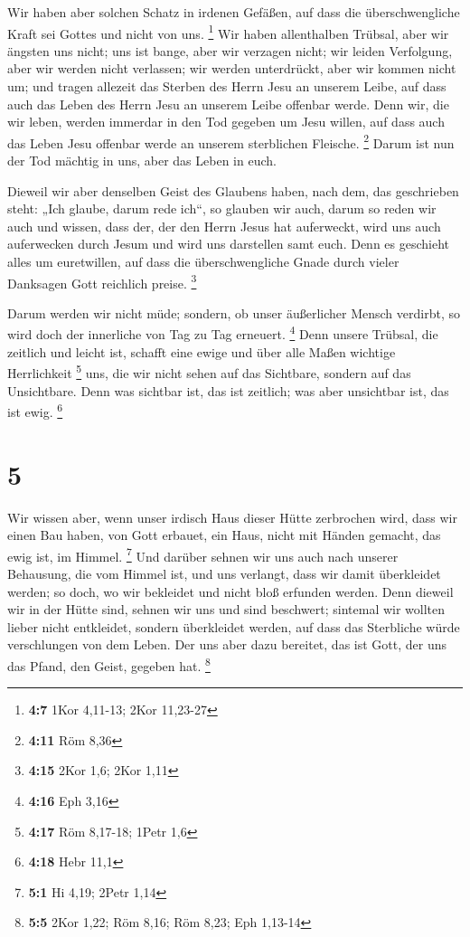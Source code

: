  Wir haben aber solchen Schatz in irdenen Gefäßen, auf
dass die überschwengliche Kraft sei Gottes und nicht von uns.
\footnote{\textbf{4:7} 1Kor 4,11-13; 2Kor 11,23-27}  Wir
haben allenthalben Trübsal, aber wir ängsten uns nicht; uns ist bange,
aber wir verzagen nicht;  wir leiden Verfolgung, aber wir
werden nicht verlassen; wir werden unterdrückt, aber wir kommen nicht
um;  und tragen allezeit das Sterben des Herrn Jesu an
unserem Leibe, auf dass auch das Leben des Herrn Jesu an unserem Leibe
offenbar werde.  Denn wir, die wir leben, werden immerdar
in den Tod gegeben um Jesu willen, auf dass auch das Leben Jesu offenbar
werde an unserem sterblichen Fleische. \footnote{\textbf{4:11} Röm 8,36}
 Darum ist nun der Tod mächtig in uns, aber das Leben in
euch.

 Dieweil wir aber denselben Geist des Glaubens haben,
nach dem, das geschrieben steht: „Ich glaube, darum rede ich``, so
glauben wir auch, darum so reden wir auch  und wissen,
dass der, der den Herrn Jesus hat auferweckt, wird uns auch auferwecken
durch Jesum und wird uns darstellen samt euch.  Denn es
geschieht alles um euretwillen, auf dass die überschwengliche Gnade
durch vieler Danksagen Gott reichlich preise. \footnote{\textbf{4:15}
  2Kor 1,6; 2Kor 1,11}

 Darum werden wir nicht müde; sondern, ob unser
äußerlicher Mensch verdirbt, so wird doch der innerliche von Tag zu Tag
erneuert. \footnote{\textbf{4:16} Eph 3,16}  Denn unsere
Trübsal, die zeitlich und leicht ist, schafft eine ewige und über alle
Maßen wichtige Herrlichkeit \footnote{\textbf{4:17} Röm 8,17-18; 1Petr
  1,6}  uns, die wir nicht sehen auf das Sichtbare,
sondern auf das Unsichtbare. Denn was sichtbar ist, das ist zeitlich;
was aber unsichtbar ist, das ist ewig. \footnote{\textbf{4:18} Hebr 11,1}

\hypertarget{section-2}{%
\section{5}\label{section-2}}

 Wir wissen aber, wenn unser irdisch Haus dieser Hütte
zerbrochen wird, dass wir einen Bau haben, von Gott erbauet, ein Haus,
nicht mit Händen gemacht, das ewig ist, im Himmel. \footnote{\textbf{5:1}
  Hi 4,19; 2Petr 1,14}  Und darüber sehnen wir uns auch
nach unserer Behausung, die vom Himmel ist, und uns verlangt, dass wir
damit überkleidet werden;  so doch, wo wir bekleidet und
nicht bloß erfunden werden.  Denn dieweil wir in der Hütte
sind, sehnen wir uns und sind beschwert; sintemal wir wollten lieber
nicht entkleidet, sondern überkleidet werden, auf dass das Sterbliche
würde verschlungen von dem Leben.  Der uns aber dazu
bereitet, das ist Gott, der uns das Pfand, den Geist, gegeben hat.
\footnote{\textbf{5:5} 2Kor 1,22; Röm 8,16; Röm 8,23; Eph 1,13-14}

